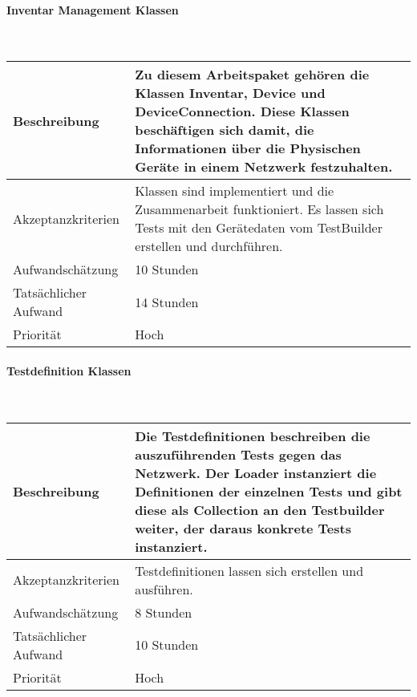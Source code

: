 \documentclass[]{subfiles}
\begin{document}
        \paragraph*{Inventar Management Klassen}\mbox{} \\
        \begin{tabularx}{\textwidth}{lX}
            \toprule
            Beschreibung & Zu diesem Arbeitspaket gehören die Klassen Inventar, Device und DeviceConnection. Diese Klassen beschäftigen sich damit, die Informationen über die Physischen Geräte in einem Netzwerk festzuhalten.\\
            \midrule
            Akzeptanzkriterien & Klassen sind implementiert und die Zusammenarbeit funktioniert. Es lassen sich Tests mit den Gerätedaten vom TestBuilder erstellen und durchführen.\\
            \midrule
            Aufwandschätzung & 10 Stunden\\
            Tatsächlicher Aufwand & 14 Stunden\\
            \midrule
            Priorität & Hoch \\
            \bottomrule
        \end{tabularx}
        \newpage
    
        \paragraph*{Testdefinition Klassen}\mbox{} \\
        \begin{tabularx}{\textwidth}{lX}
            \toprule
            Beschreibung & Die Testdefinitionen beschreiben die auszuführenden Tests gegen das Netzwerk. Der Loader instanziert die Definitionen der einzelnen Tests und gibt diese als Collection an den Testbuilder weiter, der daraus konkrete Tests instanziert.\\
            \midrule
            Akzeptanzkriterien & Testdefinitionen lassen sich erstellen und ausführen.\\
            \midrule
            Aufwandschätzung & 8 Stunden\\
            Tatsächlicher Aufwand & 10 Stunden\\
            \midrule
            Priorität & Hoch\\
            \bottomrule
        \end{tabularx}
    
\end{document}
